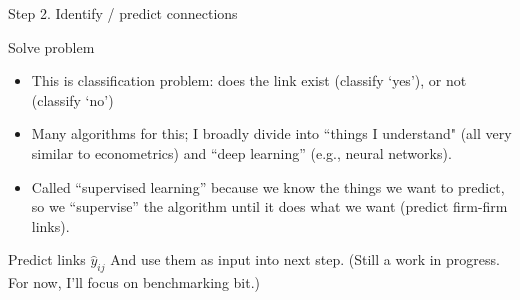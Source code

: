 \documentclass[12pt]{beamer}
\begin{document}
\begin{frame}{Step 2. Identify / predict connections}

\begin{block}{Solve problem}
\begin{itemize}
\item This is classification problem: does the link exist (classify `yes'), or not (classify `no')
\item Many algorithms for this; I broadly divide into ``things I understand" (all very similar to econometrics) and ``deep learning'' (e.g., neural networks). %
\item Called ``supervised learning'' because we know the things we want to predict, so we ``supervise'' the algorithm until it does what we want (predict firm-firm links).
\end{itemize}
\end{block}

\begin{block}{Predict links $\hat{y}_{ij}$}
And use them as input into next step. (Still a work in progress. For now, I'll focus on benchmarking bit.)
\end{block}


\end{frame}
\end{document}

